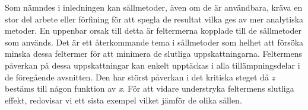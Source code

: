 
Som nämndes i inledningen kan sållmetoder, även om de är användbara, kräva en stor del arbete eller förfining för att spegla de resultat vilka ges av mer analytiska metoder. 
En uppenbar orsak till  detta är feltermerna kopplade till de sållmetoder som används. 
Det är ett återkommande tema i sållmetoder som helhet att försöka minska dessa feltermer för att minimera de slutliga uppskattningarna.
Feltermens påverkan på dessa uppskattningar kan enkelt upptäckas i alla tillämpningsdelar i de föregående avsnitten.
Den har störst påverkan i det kritiska steget då \textit{z} bestäms till någon funktion av \textit{x}.
För att vidare understryka feltermens slutliga effekt, redovisar vi ett sista exempel vilket jämför de olika sållen.

